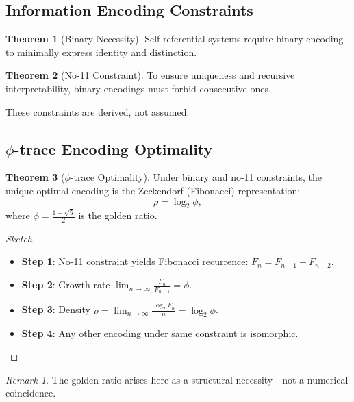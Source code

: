 \documentclass[11pt]{article}
\theoremstyle{remark}
\newtheorem{remark}{Remark}
\theoremstyle{definition}
\newtheorem{theorem}{Theorem}
\begin{document}
\subsection{Information Encoding Constraints}

\begin{theorem}[Binary Necessity]
Self-referential systems require binary encoding to minimally express identity and distinction.
\end{theorem}

\begin{theorem}[No-11 Constraint]
To ensure uniqueness and recursive interpretability, binary encodings must forbid consecutive ones.
\end{theorem}

These constraints are derived, not assumed.

\subsection{\texorpdfstring{$\phi$}{phi}-trace Encoding Optimality}

\begin{theorem}[$\phi$-trace Optimality]
Under binary and no-11 constraints, the unique optimal encoding is the Zeckendorf (Fibonacci) representation:
\[
\rho = \log_2 \phi,
\]
where $\phi = \frac{1+\sqrt{5}}{2}$ is the golden ratio.
\end{theorem}

\begin{proof}[Sketch]
\vspace{1ex}

\begin{itemize}
\item \textbf{Step 1}: No-11 constraint yields Fibonacci recurrence: $F_n = F_{n-1} + F_{n-2}$.
\item \textbf{Step 2}: Growth rate $\lim_{n\to\infty} \frac{F_n}{F_{n-1}} = \phi$.
\item \textbf{Step 3}: Density $\rho = \lim_{n\to\infty} \frac{\log_2 F_n}{n} = \log_2 \phi$.
\item \textbf{Step 4}: Any other encoding under same constraint is isomorphic.
\end{itemize}
\end{proof}

\begin{remark}
The golden ratio arises here as a structural necessity—not a numerical coincidence.
\end{remark}
\end{document}
